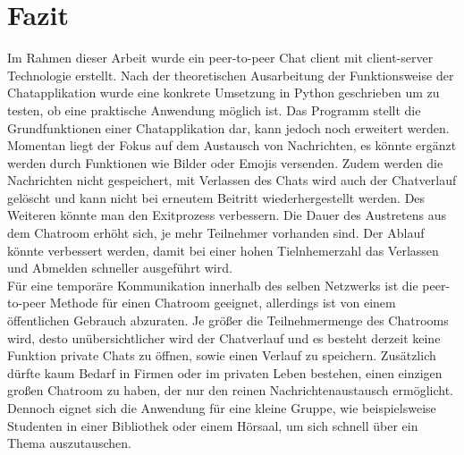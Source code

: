 \section{Fazit}
Im Rahmen dieser Arbeit wurde ein peer-to-peer Chat client mit client-server Technologie erstellt. 
Nach der theoretischen Ausarbeitung der Funktionsweise der Chatapplikation wurde eine konkrete Umsetzung in Python geschrieben um zu testen,
ob eine praktische Anwendung möglich ist.
Das Programm stellt die Grundfunktionen einer Chatapplikation dar, kann jedoch noch erweitert werden. 
Momentan liegt der Fokus auf dem Austausch von Nachrichten, es könnte ergänzt werden durch Funktionen wie Bilder oder Emojis versenden. Zudem werden
die Nachrichten nicht gespeichert, mit Verlassen des Chats wird auch der Chatverlauf gelöscht und kann nicht bei erneutem Beitritt wiederhergestellt werden.
Des Weiteren könnte man den Exitprozess verbessern. Die Dauer des Austretens aus dem Chatroom erhöht sich, je mehr Teilnehmer vorhanden sind.
Der Ablauf könnte verbessert werden, damit bei einer hohen Tielnhemerzahl das Verlassen und Abmelden schneller ausgeführt wird.
\\
Für eine temporäre Kommunikation innerhalb des selben Netzwerks ist die peer-to-peer Methode für einen Chatroom geeignet, allerdings ist von einem 
öffentlichen Gebrauch abzuraten. Je größer die Teilnehmermenge des Chatrooms wird, desto unübersichtlicher wird der Chatverlauf und es besteht derzeit keine 
Funktion private Chats zu öffnen, sowie einen Verlauf zu speichern.
Zusätzlich dürfte kaum Bedarf in Firmen oder im privaten Leben bestehen, einen einzigen großen Chatroom zu haben, der nur den reinen Nachrichtenaustausch ermöglicht.
Dennoch eignet sich die Anwendung für eine kleine Gruppe, wie beispielsweise Studenten in einer Bibliothek oder einem Hörsaal, um sich schnell über ein Thema auszutauschen.
